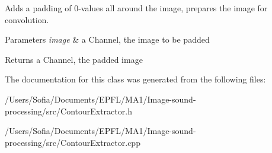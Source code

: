 Adds a padding of 0-\/values all around the image, prepares the image for convolution. 


\begin{DoxyParams}{Parameters}
{\em image} & a Channel, the image to be padded \\
\hline
\end{DoxyParams}
\begin{DoxyReturn}{Returns}
a Channel, the padded image 
\end{DoxyReturn}


The documentation for this class was generated from the following files\+:\begin{DoxyCompactItemize}
\item 
/\+Users/\+Sofia/\+Documents/\+E\+P\+F\+L/\+M\+A1/\+Image-\/sound-\/processing/src/Contour\+Extractor.\+h\item 
/\+Users/\+Sofia/\+Documents/\+E\+P\+F\+L/\+M\+A1/\+Image-\/sound-\/processing/src/Contour\+Extractor.\+cpp\end{DoxyCompactItemize}

